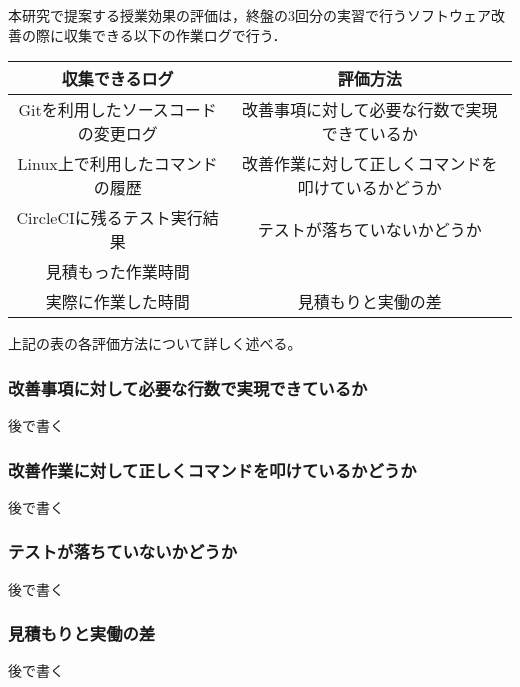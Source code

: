 本研究で提案する授業効果の評価は，終盤の3回分の実習で行うソフトウェア改善の際に収集できる以下の作業ログで行う．

\begin{table}[ht]
  \begin{center}
    \begin{tabular}{|c|c|}
      \hline
      収集できるログ & 評価方法 \\
      \hline
      Gitを利用したソースコードの変更ログ & 改善事項に対して必要な行数で実現できているか \\
      \hline
      Linux上で利用したコマンドの履歴 & 改善作業に対して正しくコマンドを叩けているかどうか \\
      \hline
      CircleCIに残るテスト実行結果 & テストが落ちていないかどうか \\
      \hline
      見積もった作業時間 & \\
      \cline{1-1}
      実際に作業した時間 & 見積もりと実働の差 \\
      \hline
    \end{tabular}
  \end{center}
\end{table}

上記の表の各評価方法について詳しく述べる。

\subsubsection{改善事項に対して必要な行数で実現できているか}

後で書く

\subsubsection{改善作業に対して正しくコマンドを叩けているかどうか}

後で書く

\subsubsection{テストが落ちていないかどうか}

後で書く

\subsubsection{見積もりと実働の差}

後で書く
